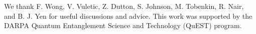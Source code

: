 \documentclass[aps,twocolumn,secnumarabic,amsmath,amssymb,pra,groupedaddress,
showpacs, showkeys]{revtex4-1}
\begin{document}


\begin{acknowledgments}

  We thank F. Wong, V. Vuletic, Z. Dutton, S. Johnson, M. Tobenkin, R. Nair,
  and B. J. Yen for useful discussions and advice. This work was supported by
  the DARPA Quantum Entanglement Science and Technology (QuEST) program.

\end{acknowledgments}


\end{document}

